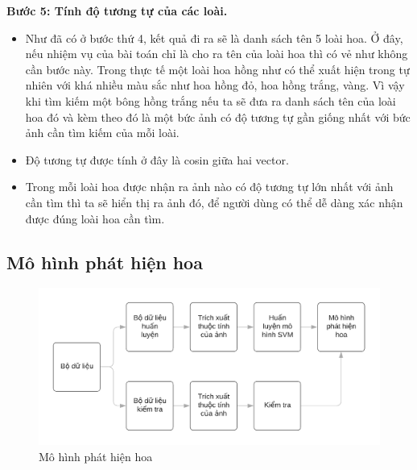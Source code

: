 \documentclass[12pt]{report}
\begin{document}
												
		\textbf{Bước 5: Tính độ tương tự của các loài.} 
		\begin{itemize}
			\item Như đã có ở bước thứ 4, kết quả đi ra sẽ là danh sách tên 5 loài hoa. Ở đây, nếu nhiệm vụ của bài toán chỉ là cho ra tên của loài hoa thì có vẻ như không cần bước này. Trong thực tế một loài hoa hồng như có thể xuất hiện trong tự nhiên với khá nhiều màu sắc như hoa hồng đỏ, hoa hồng trắng, vàng. Vì vậy khi tìm kiếm một bông hồng trắng nếu ta sẽ đưa ra danh sách tên của loài hoa đó và kèm theo đó là một bức ảnh có độ tương tự gần giống nhất với bức ảnh cần tìm kiếm của mỗi loài.
			\item Độ tương tự được tính ở đây là cosin giữa hai vector.
			      			      			      			      			      			
			\item Trong mỗi loài hoa được nhận ra ảnh nào có độ tương tự lớn nhất với ảnh cần tìm thì ta sẽ hiển thị ra ảnh đó, để người dùng có thể dễ dàng xác nhận được đúng loài hoa cần tìm.
		\end{itemize}	
														
		\subsection{Mô hình phát hiện hoa}
		\begin{figure}[h]
			\centering
			\includegraphics[scale=0.4]{mohinh_phathien}
			\caption{Mô hình phát hiện hoa}
			\label{fig:mohinh_phathien}
		\end{figure}
										
\end{document}
